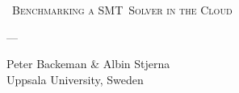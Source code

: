 {
	\centering
	\vspace{1cm}
	{\scshape\Huge\ Benchmarking a SMT~Solver in the Cloud \par}
	\vspace{1cm}
	{\scshape\Large --- \par}
	\vspace{0.9cm}
	\begin{center}{Peter Backeman \& Albin Stjerna}\\
	Uppsala University, Sweden
	\end{center}
}

